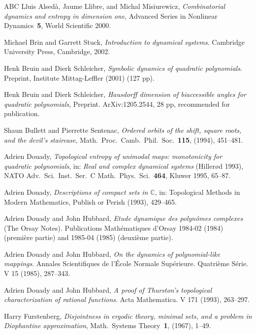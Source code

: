 \documentclass[12pt]{amsart}
\newcommand{\C}{\mathbb C}
\newcommand{\0}{\texttt{0}}
\newcommand{\1}{\texttt{1}}
\theoremstyle{definition}
\numberwithin{equation}{section}
\begin{document}
\begin{thebibliography}{ABC}
 Lluis Alsed\`a, Jaume Llibre, and Michal Misiurewicz,
   \emph{Combinatorial dynamics and entropy in dimension one},
   Advanced Series in Nonlinear Dynamics~\textbf{5}, World Scientific 2000.

 Michael Brin and Garrett Stuck, 
   \emph{Introduction to dynamical systems}. Cambridge University Press,
   Cambridge, 2002. 

 Henk Bruin and Dierk Schleicher, \emph{Symbolic dynamics of quadratic polynomials}. Preprint, Institute Mittag-Leffler (2001) (127 pp). 

 Henk Bruin and Dierk Schleicher,
   \emph{Hausdorff dimension of biaccessible
   angles for quadratic polynomials}, Preprint. ArXiv:1205.2544, 28 pp,
   recommended for publication.

 Shaun Bullett and Pierrette Sentenac, \emph{Ordered orbits of the
   shift, square roots, and the devil's staircase},
   Math.~Proc.~Camb.~Phil.~Soc.~\textbf{115}, (1994), 451--481.

 Adrien Douady, \emph{Topological entropy of unimodal maps:
   monotonicity for quadratic polynomials}, in:
   \emph{Real and complex dynamical systems}
   (Hiller{\o}d 1993), NATO Adv.~Sci.~Inst.~Ser.~C
   Math.~Phys.~Sci.~\textbf{464}, Kluwer 1995, 65--87.

 Adrien Douady, 
   \emph{Descriptions of compact sets in $\C$}, in:
   Topological Methods in Modern Mathematics, Publish or Perish
   (1993), 429--465.

 Adrien Douady and John Hubbard,
   \emph{Etude dynamique des polyn\^omes complexes} (The Orsay Notes).
   Publications Math\'ematiques d'Orsay 1984-02 (1984) (premi\`ere partie)
   and 1985-04 (1985) (deuxi\`eme partie).

 Adrien Douady and John Hubbard,
   \emph{On the dynamics of polynomial-like mappings}. Annales Scientifiques de
   l'\'Ecole Normale Sup\'erieure. Quatri\`eme S\'erie. V 15 (1985), 287--343.

 Adrien Douady and John Hubbard,
   \emph{A proof of {T}hurston's topological characterization of rational
   functions}. Acta Mathematica. V 171 (1993), 263--297.

 Harry Furstenberg, \emph{Disjointness in ergodic
   theory, minimal sets, and a problem in Diophantine approximation},
   Math.~Systems Theory~\textbf{1}, (1967), 1--49.


\end{thebibliography}
\end{document}
